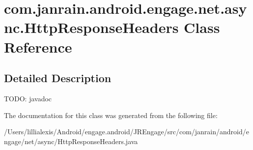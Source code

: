 \hypertarget{classcom_1_1janrain_1_1android_1_1engage_1_1net_1_1async_1_1_http_response_headers}{
\section{com.janrain.android.engage.net.async.HttpResponseHeaders Class Reference}
\label{classcom_1_1janrain_1_1android_1_1engage_1_1net_1_1async_1_1_http_response_headers}
}


\subsection{Detailed Description}
TODO: javadoc 

The documentation for this class was generated from the following file:\begin{DoxyCompactItemize}
\item 
/Users/lillialexis/Android/engage.android/JREngage/src/com/janrain/android/engage/net/async/HttpResponseHeaders.java\end{DoxyCompactItemize}
